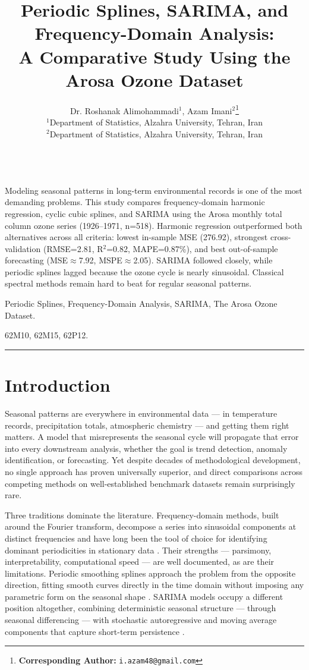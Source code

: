 \documentclass[12pt,a4paper]{article}
\title{Periodic Splines, SARIMA, and Frequency-Domain Analysis: \\
       A Comparative Study Using the Arosa Ozone Dataset}
\author{
  Dr. Roshanak Alimohammadi$^1$, Azam Imani$^{2}$\footnote[2]{{\bf Corresponding Author:} {\tt i.azam48@gmail.com}} \\
  $^1$Department of Statistics, Alzahra University, Tehran, Iran \\
  $^2$Department of Statistics, Alzahra University, Tehran, Iran
}
\date{}
\begin{document}
\thispagestyle{empty}
\maketitle

\\
Modeling seasonal patterns in long-term environmental records is one of the most demanding problems. This study compares frequency-domain harmonic regression, cyclic cubic splines, and SARIMA using the Arosa monthly total column ozone series (1926–1971, n=518). Harmonic regression outperformed both alternatives across all criteria: lowest in-sample MSE (276.92), strongest cross-validation (RMSE=2.81, R$^2$=0.82, MAPE=0.87\%), and best out-of-sample forecasting (MSE$\approx$7.92, MSPE$\approx$2.05). SARIMA followed closely, while periodic splines lagged because the ozone cycle is nearly sinusoidal. Classical spectral methods remain hard to beat for regular seasonal patterns.

 Periodic Splines, Frequency-Domain Analysis, SARIMA, The Arosa Ozone Dataset.

 62M10, 62M15, 62P12.

\rule{\textwidth}{0.2mm}

\section{Introduction}
Seasonal patterns are everywhere in environmental data — in temperature records, precipitation totals, atmospheric chemistry — and getting them right matters. A model that misrepresents the seasonal cycle will propagate that error into every downstream analysis, whether the goal is trend detection, anomaly identification, or forecasting. Yet despite decades of methodological development, no single approach has proven universally superior, and direct comparisons across competing methods on well-established benchmark datasets remain surprisingly rare.

Three traditions dominate the literature. Frequency-domain methods, built around the Fourier transform, decompose a series into sinusoidal components at distinct frequencies and have long been the tool of choice for identifying dominant periodicities in stationary data \cite{Brockwell2016}. Their strengths — parsimony, interpretability, computational speed — are well documented, as are their limitations. Periodic smoothing splines approach the problem from the opposite direction, fitting smooth curves directly in the time domain without imposing any parametric form on the seasonal shape \cite{Wood2017}. SARIMA models occupy a different position altogether, combining deterministic seasonal structure — through seasonal differencing — with stochastic autoregressive and moving average components that capture short-term persistence \cite{Hyndman2021, Box2015}.
\end{document}
